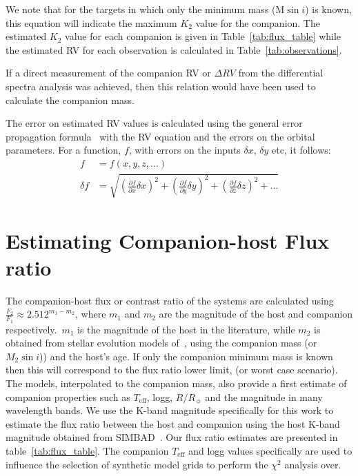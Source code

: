 We note that for the targets in which only the minimum mass (\(\textrm{M}\sin{i} \)) is known, this equation will indicate the maximum \(K_2\) value for the companion. The estimated \(K_2\) value for each companion is given in Table~\ref{tab:flux_table} while the estimated RV for each observation is calculated in Table~\ref{tab:observations}.

If a direct measurement of the companion RV or \(\Delta RV \) from the differential spectra analysis was achieved, then this relation would have been used to calculate the companion mass.

The error on estimated RV values is calculated using the general error propagation formula~\citep{ku_notes_1966} with the RV equation and the errors on the orbital parameters. For a function, \(f\), with errors on the inputs \(\delta x\), \(\delta y\) etc, it follows: 
\begin{align}
	f &= f(x, y, z, ...)\\
	\delta f &= \sqrt{{\left( \frac{\partial f}{\partial x} \delta x\right)}^2 +  {\left(\frac{\partial f}{\partial y} \delta y\right)}^2 + {\left(\frac{\partial f}{\partial z} \delta z\right)}^2 + ...}
\end{align}  


\section{Estimating Companion-host Flux ratio}

\label{compaion flux ration}
The companion-host flux or contrast ratio of the systems are calculated using \( \frac{F_{2}}{F_{1}} \approx 2.512^{m_{1}-m_{2}} \), where \(m_{1} \) and \(m_{2} \) are the magnitude of the host and companion respectively.\ \(m_{1} \) is the magnitude of the host in the literature, while \(m_{2} \) is obtained from stellar evolution models of~\citet{baraffe_evolutionary_2003, baraffe_new_2015}, using the companion mass (or \(M_{2}\sin{i}\))) and the host's age. If only the companion minimum mass is known then this will correspond to the flux ratio lower limit, (or worst case scenario). The models, interpolated to the companion mass, also provide a first estimate of companion properties such as \(T_{\textrm{eff}}\), logg, \(R/R_{\sun}\) and the magnitude in many wavelength bands.
We use the K-band magnitude specifically for this work to estimate the flux ratio between the host and companion using the host K-band magnitude obtained from SIMBAD~\citep{wenger_simbad_2000}. Our flux ratio estimates are presented in table~\ref{tab:flux_table}.
The companion \(T_{\textrm{eff}}\) and logg values specifically are used to influence the selection of synthetic model grids to perform the \(\chi^2\) analysis over.

